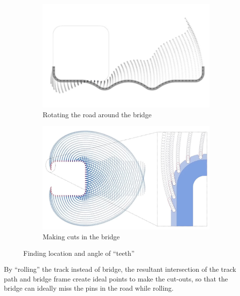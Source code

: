 \documentclass[12pt]{article}
\begin{document}
        \begin{figure}[H]
            \centering
            \begin{subfigure}{0.49\textwidth}
            \centering
            \includegraphics[width = \textwidth]{images/bridge_teeth_1.jpg}
            \caption{Rotating the road around the bridge}\label{fig:teeth1}
            \end{subfigure}
            \begin{subfigure}{0.49\textwidth}
            \centering
            \includegraphics[width = \textwidth]{images/bridge_teeth_2.jpg}
            \caption{Making cuts in the bridge}\label{fig:teeth2}
            \end{subfigure}

            \caption{Finding location and angle of ``teeth''~\cite{parker.2023}}
        \end{figure}
     
        By ``rolling'' the track instead of bridge, the resultant intersection of the track path and bridge frame create ideal points to make the cut-outs, so that the bridge can ideally miss the pins in the road while rolling.
        
\end{document}
